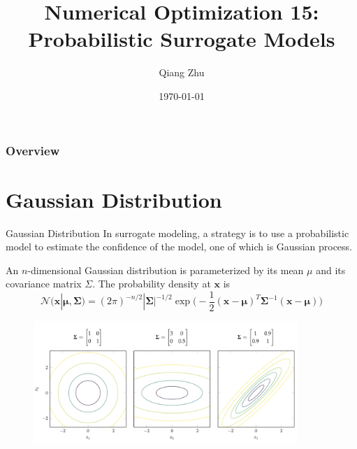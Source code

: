 \documentclass{beamer}
\title[Probabilistic Surrogate Models]{Numerical Optimization 15: Probabilistic Surrogate Models} %
\author{Qiang Zhu} %
\institute[University of Nevada Las Vegas] %
{
University of Nevada Las Vegas\\ %
\medskip
}
\date{\today} %
\begin{document}
\begin{frame}
\titlepage %
\end{frame}

\begin{frame}
\frametitle{Overview} %
\tableofcontents %
\end{frame}



\section{Gaussian Distribution}
\begin{frame}{Gaussian Distribution}
In surrogate modeling, a strategy is to use a probabilistic model to estimate the confidence of the model, one of which is Gaussian process.

An $n$-dimensional Gaussian distribution is parameterized by its mean $\mu$ and its covariance matrix $\Sigma$. The probability density at $\boldsymbol{x}$ is
\begin{equation*}
    \mathcal{N}(\boldsymbol{x}|\boldsymbol{\mu}, \boldsymbol{\Sigma}) =
    (2\pi)^{-n/2} |\boldsymbol{\Sigma}|^{-1/2} \exp\bigg(-\frac{1}{2}(\boldsymbol{x-\mu})^T \boldsymbol{\Sigma}^{-1}(\boldsymbol{x-\mu})\bigg)
\end{equation*}

\begin{figure}
\centering
\includegraphics[width=100mm]{Figs/gaussian.jpeg}
\end{figure}   

\end{frame}
\end{document}
